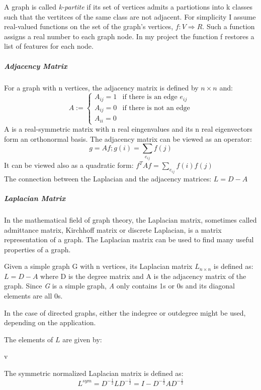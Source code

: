 \documentclass{report}
\begin{document}
A graph is called \textit{k-partite} if its set of vertices admits a partiotions into k classes such that the vertitces of the same class are not adjacent.
For simplicity I assume real-valued functions on the set of the graph’s
vertices, $f : V \Rightarrow R$. Such a function assigns a real number
to each graph node. In my project the function f restores a list of features for each node.

\subparagraph{Adjacency Matrix} For a graph with n vertices, the adjacency matrix is defined by $n \times n$ and:
\begin{equation}
A := \begin{cases}
A_{ij} = 1 & \text{if there is an edge $e_{ij}$}\\
A_{ij} = 0 & \text{if there is not an edge}\\
A_{ii} = 0 
\end{cases}
\end{equation}
A is a real-symmetric matrix with n real eingenvalues and its n real eigenvectors form an orthonormal basis.
The adjacency matrix can be viewed as an operator:
\[ g = Af;g(i) = \sum_{e_{ij}} f(j) \]
It can be viewed also as a quadratic form:
$f^T A f =  \sum_{e_{ij}} f(i)f(j) $\\
The connection between the Laplacian and the adjacency matrices:
 $L = D - A$

\subparagraph{Laplacian Matrix}
In the mathematical field of graph theory, the Laplacian matrix, sometimes called admittance matrix, Kirchhoff matrix or discrete Laplacian, is a matrix representation of a graph. The Laplacian matrix can be used to find many useful properties of a graph.

Given a simple graph G with n vertices, its Laplacian matrix $L_{n\times n} $ is defined as: $ L = D-A$ 
where D is the degree matrix and A is the adjacency matrix of the graph. Since \textit{G} is a simple graph, \textit{A} only contains 1s or 0s and its diagonal elements are all 0s.

In the case of directed graphs, either the indegree or outdegree might be used, depending on the application.

The elements of $L$ are given by:

v

The symmetric normalized Laplacian matrix is defined as:
\[
L^{sym} = D^{-\tfrac{1}{2}} L D^{-\tfrac{1}{2}} = I -D^{-\tfrac{1}{2}} A D^{-\tfrac{1}{2}} \] 
\end{document}
